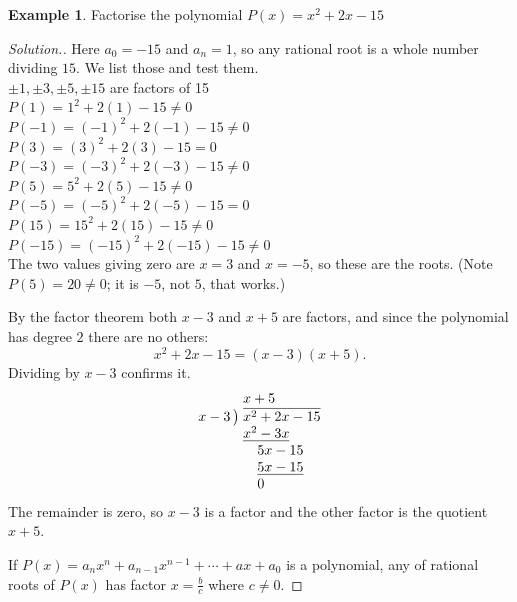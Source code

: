 \documentclass[11pt,a4paper]{article}
\theoremstyle{definition}
\newtheorem{example}[thm]{Example}
\newenvironment{solution}
  {\renewcommand{\qedsymbol}{}\begin{proof}[\textit{Solution}.]}
  {\end{proof}}
\begin{document}
\begin{example}

Factorise the polynomial $P(x)=x^2+2x-15$
\end{example}
\begin{solution}

Here $a_{0}=-15$ and $a_{n}=1$, so any rational root is a whole number dividing
$15$. We list those and test them.\\

$\pm 1, \pm 3, \pm 5, \pm 15$ are factors of 15\\

$P(1)=1^2+2(1)-15\neq 0$\\

$P(-1)=(-1)^2+2(-1)-15\neq 0$\\

$P(3)=(3)^2+2(3)-15 = 0$\\

$P(-3) =(-3)^2+2(-3)-15\neq 0$\\

$P(5)=5^2+2(5)-15\neq 0$\\

$P(-5)=(-5)^2+2(-5)-15=0$\\

$P(15)=15^2+2(15)-15\neq 0$\\

$P(-15)=(-15)^2+2(-15)-15\neq 0$\\

The two values giving zero are $x=3$ and $x=-5$, so these are the roots. (Note
$P(5)=20\neq 0$; it is $-5$, not $5$, that works.)

By the factor theorem both $x-3$ and $x+5$ are factors, and since the polynomial
has degree $2$ there are no others:
$$x^{2}+2x-15=(x-3)(x+5).$$
Dividing by $x-3$ confirms it.\\

$$\begin{array}{r@{\;}l}
 & x+5\\
x-3\,\big) & \overline{x^{2}+2x-15}\\
 & \underline{x^{2}-3x}\phantom{{}-15}\\
 & \phantom{x^{2}}5x-15\\
 & \phantom{x^{2}}\underline{5x-15}\\
 & \phantom{x^{2}}0
\end{array}$$
The remainder is zero, so $x-3$ is a factor and the other factor is the
quotient $x+5$.

If $P(x)=a_nx^n+a_{n-1}x^{n-1}+\cdots+ax+a_0$ is a polynomial, any of rational roots of $P(x)$ has factor $x=\frac{b}{c}$ where $c\neq 0$.
\end{solution}
\end{document}
